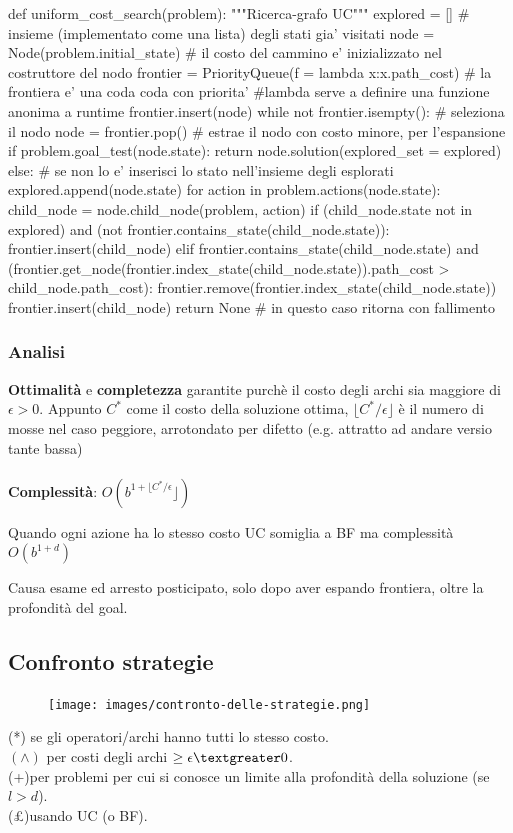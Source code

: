 \begin{python}
	def uniform_cost_search(problem): """Ricerca-grafo UC"""
		explored = [] # insieme (implementato come una lista) degli stati gia' visitati
		node = Node(problem.initial_state) # il costo del cammino e' inizializzato nel costruttore del nodo
		frontier = PriorityQueue(f = lambda x:x.path_cost) # la frontiera e' una coda coda con priorita'
		#lambda serve a definire una funzione anonima a runtime
		frontier.insert(node)
		while not frontier.isempty():
			# seleziona il nodo node = frontier.pop() # estrae il nodo con costo minore, per l'espansione
			if problem.goal_test(node.state):
				return node.solution(explored_set = explored)
			else: # se non lo e' inserisci lo stato nell'insieme degli esplorati
			explored.append(node.state)
				for action in problem.actions(node.state):
			child_node = node.child_node(problem, action)
			if (child_node.state not in explored) and (not frontier.contains_state(child_node.state)):
				frontier.insert(child_node)
			elif frontier.contains_state(child_node.state) and 
				 (frontier.get_node(frontier.index_state(child_node.state)).path_cost > child_node.path_cost):
				frontier.remove(frontier.index_state(child_node.state))
				frontier.insert(child_node)
		return None # in questo caso ritorna con fallimento
\end{python}

\subsubsection{Analisi}
\textbf{Ottimalità} e \textbf{completezza} garantite purchè il costo degli archi sia maggiore di $\epsilon > 0$.
Appunto $C^*$ come il costo della soluzione ottima, $\lfloor C^*/\epsilon \rfloor$ è il numero 
di mosse nel caso peggiore, arrotondato per difetto (e.g. attratto ad andare versio tante bassa)\\\\
\textbf{Complessità}: $O(b^{1+\lfloor C^*/\epsilon}\rfloor)$
\begin{note}
	Quando ogni azione ha lo stesso costo UC somiglia a BF ma complessità $O(b^{1+d})$
\end{note}
\hspace{-15pt}Causa esame ed arresto posticipato, solo dopo aver espando frontiera, oltre la profondità del goal.

\subsection{Confronto strategie}
\begin{figure}[h!]
	\centering
	\texttt{[image: images/contronto-delle-strategie.png]}
\end{figure}

\hspace{-15pt}(*) se gli operatori/archi hanno tutti lo stesso costo.\\
$(\wedge)$ per costi degli archi $\geq \epsilon \textgreater 0$.\\
(+)per problemi per cui si conosce un limite alla profondità della soluzione (se $l>d$).\\
(£)usando UC (o BF).